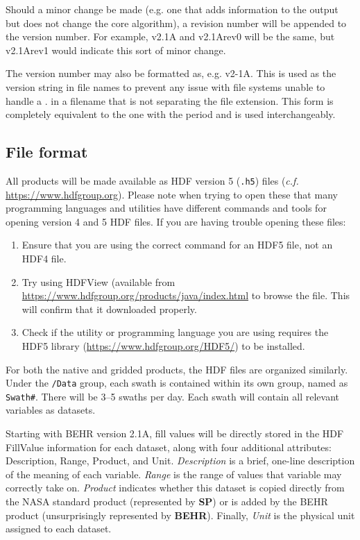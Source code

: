 \documentclass[12pt]{article}
\begin{document}
	Should a minor change be made (e.g. one that adds information to the output but
does not change the core algorithm), a revision number will be appended to the
version number. For example, v2.1A and v2.1Arev0 will be the same, but v2.1Arev1
would indicate this sort of minor change.

	The version number may also be formatted as, e.g. v2-1A. This is used as the version
string in file names to prevent any issue with file systems unable to handle a . in
a filename that is not separating the file extension. This form is completely
equivalent to the one with the period and is used interchangeably.
	
	\subsection{File format}
	All products will be made available as HDF version 5 (\texttt{.h5}) files (\emph{c.f.} \url{https://www.hdfgroup.org}).  Please note when trying to open these that many programming languages and utilities have different commands and tools for opening version 4 and 5 HDF files. If you are having trouble opening these files:
	\begin{enumerate}
		\item Ensure that you are using the correct command for an HDF5 file, not an HDF4 file.
		\item Try using HDFView (available from \url{https://www.hdfgroup.org/products/java/index.html} to browse the file. This will confirm that it downloaded properly.
		\item Check if the utility or programming language you are using requires the HDF5 library (\url{https://www.hdfgroup.org/HDF5/}) to be installed. 
	\end{enumerate}
	
	For both the native and gridded products, the HDF files are organized similarly. Under the \texttt{/Data} group, each swath is contained within its own group, named as \texttt{Swath\#}. There will be 3--5 swaths per day. Each swath will contain all relevant variables as datasets.
	
	Starting with BEHR version 2.1A, fill values will be directly stored in the HDF FillValue information for each dataset, along with four additional attributes: Description, Range, Product, and Unit.  \emph{Description} is a brief, one-line description of the meaning of each variable. \emph{Range} is the range of values that variable may correctly take on. \emph{Product} indicates whether this dataset is copied directly from the NASA standard product (represented by \textbf{SP}) or is added by the BEHR product (unsurprisingly represented by \textbf{BEHR}). Finally, \emph{Unit} is the physical unit assigned to each dataset. 
	
\end{document}
